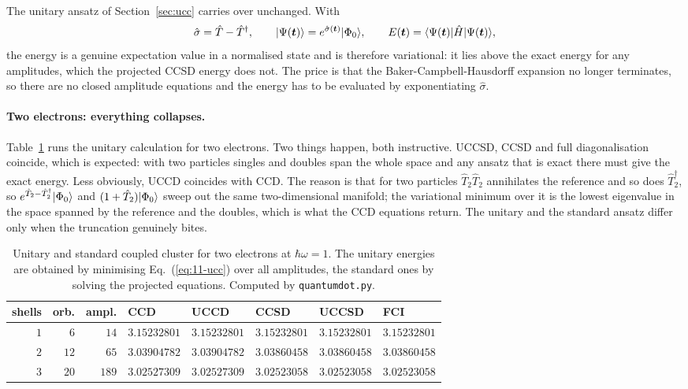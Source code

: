 The unitary ansatz of Section~\ref{sec:ucc} carries over unchanged.  With
\begin{equation}
  \hat{\sigma} = \hat{T}-\hat{T}^{\dagger},
  \qquad
  \vert \Psi(\bm{t}) \rangle = e^{\hat{\sigma}(\bm{t})}\vert \Phi_0 \rangle,
  \qquad
  E(\bm{t}) = \langle \Psi(\bm{t}) | \hat{H} | \Psi(\bm{t}) \rangle,
  \label{eq:11-ucc}
\end{equation}
the energy is a genuine expectation value in a normalised state and is
therefore variational: it lies above the exact energy for any amplitudes,
which the projected CCSD energy does not.  The price is that the
Baker-Campbell-Hausdorff expansion no longer terminates, so there are no
closed amplitude equations and the energy has to be evaluated by
exponentiating $\hat{\sigma}$.

\paragraph{Two electrons: everything collapses.}
Table~\ref{tab:11-ucctwo} runs the unitary calculation for two electrons.  Two
things happen, both instructive.  UCCSD, CCSD and full diagonalisation
coincide, which is expected: with two particles singles and doubles span the
whole space and any ansatz that is exact there must give the exact energy.
Less obviously, UCCD coincides with CCD.  The reason is that for two particles
$\hat{T}_2\hat{T}_2$ annihilates the reference and so does
$\hat{T}_2^{\dagger}$, so $e^{\hat{T}_2-\hat{T}_2^{\dagger}}\vert \Phi_0 \rangle$ and
$(1+\hat{T}_2)\vert \Phi_0 \rangle$ sweep out the same two-dimensional manifold; the
variational minimum over it is the lowest eigenvalue in the space spanned by
the reference and the doubles, which is what the CCD equations return.  The
unitary and the standard ansatz differ only when the truncation genuinely
bites.

\begin{table}[h]
\centering
\renewcommand{\arraystretch}{1.25}
\setlength{\tabcolsep}{6pt}
\small
\begin{tabular}{rrrlllll}
\toprule
shells & orb. & ampl. & CCD & UCCD & CCSD & UCCSD & FCI\\
\midrule
$1$ & $6$  & $14$  & $3.15232801$ & $3.15232801$ & $3.15232801$ &
  $3.15232801$ & $3.15232801$\\
$2$ & $12$ & $65$  & $3.03904782$ & $3.03904782$ & $3.03860458$ &
  $3.03860458$ & $3.03860458$\\
$3$ & $20$ & $189$ & $3.02527309$ & $3.02527309$ & $3.02523058$ &
  $3.02523058$ & $3.02523058$\\
\bottomrule
\end{tabular}
\caption{Unitary and standard coupled cluster for two electrons at
$\hbar\omega=1$.  The unitary energies are obtained by minimising
Eq.~(\ref{eq:11-ucc}) over all amplitudes, the standard ones by solving the
projected equations.  Computed by \texttt{quantumdot.py}.}
\label{tab:11-ucctwo}
\end{table}

